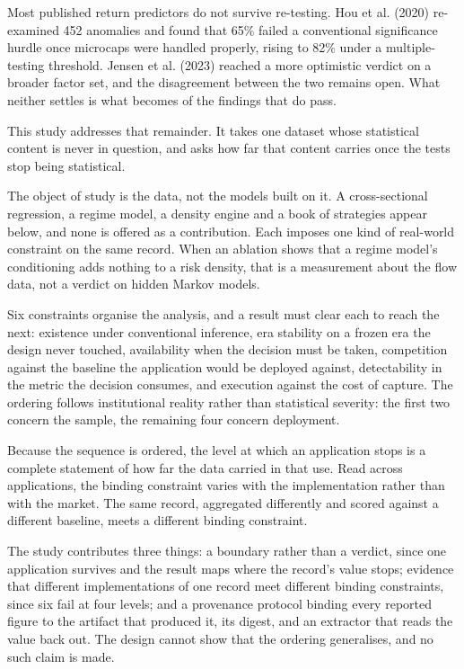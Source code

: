 \documentclass[12pt,a4paper]{article}
\begin{document}
Most published return predictors do not survive re-testing. Hou et al. (2020) re-examined 452 anomalies and found that 65\% failed a conventional significance hurdle once microcaps were handled properly, rising to 82\% under a multiple-testing threshold. Jensen et al. (2023) reached a more optimistic verdict on a broader factor set, and the disagreement between the two remains open. What neither settles is what becomes of the findings that do pass.

This study addresses that remainder. It takes one dataset whose statistical content is never in question, and asks how far that content carries once the tests stop being statistical.

The object of study is the data, not the models built on it. A cross-sectional regression, a regime model, a density engine and a book of strategies appear below, and none is offered as a contribution. Each imposes one kind of real-world constraint on the same record. When an ablation shows that a regime model's conditioning adds nothing to a risk density, that is a measurement about the flow data, not a verdict on hidden Markov models.

Six constraints organise the analysis, and a result must clear each to reach the next: existence under conventional inference, era stability on a frozen era the design never touched, availability when the decision must be taken, competition against the baseline the application would be deployed against, detectability in the metric the decision consumes, and execution against the cost of capture. The ordering follows institutional reality rather than statistical severity: the first two concern the sample, the remaining four concern deployment.

Because the sequence is ordered, the level at which an application stops is a complete statement of how far the data carried in that use. Read across applications, the binding constraint varies with the implementation rather than with the market. The same record, aggregated differently and scored against a different baseline, meets a different binding constraint.

The study contributes three things: a boundary rather than a verdict, since one application survives and the result maps where the record's value stops; evidence that different implementations of one record meet different binding constraints, since six fail at four levels; and a provenance protocol binding every reported figure to the artifact that produced it, its digest, and an extractor that reads the value back out. The design cannot show that the ordering generalises, and no such claim is made.
\end{document}
